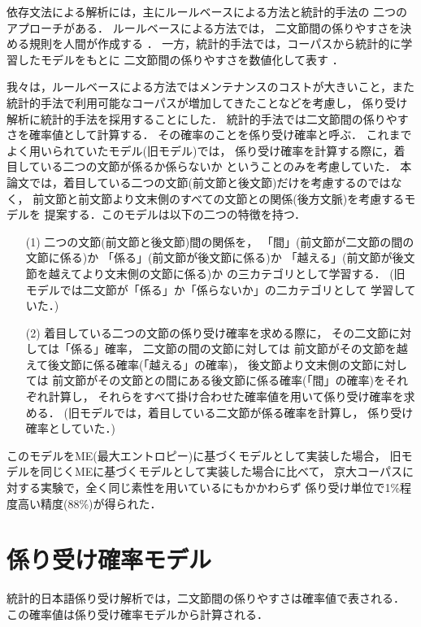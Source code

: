 依存文法による解析には，主にルールベースによる方法と統計的手法の
二つのアプローチがある．
ルールベースによる方法では，
二文節間の係りやすさを決める規則を人間が作成する
\cite{kurohashi:ipsj92,SShirai:95}．
一方，統計的手法では，コーパスから統計的に学習したモデルをもとに
二文節間の係りやすさを数値化して表す
\cite{collins:acl96,fujio:nl97,Haruno:ipsj98,ehara:nlp98,shirai:jnlp98:1}．

我々は，ルールベースによる方法ではメンテナンスのコストが大きいこと，また
統計的手法で利用可能なコーパスが増加してきたことなどを考慮し，
係り受け解析に統計的手法を採用することにした．
統計的手法では二文節間の係りやすさを確率値として計算する．
その確率のことを係り受け確率と呼ぶ．
これまでよく用いられていたモデル(旧モデル)では，
係り受け確率を計算する際に，着目している二つの文節が係るか係らないか
ということのみを考慮していた．
本論文では，着目している二つの文節(前文節と後文節)だけを考慮するのではなく，
前文節と前文節より文末側のすべての文節との関係(後方文脈)を考慮するモデルを
提案する．このモデルは以下の二つの特徴を持つ．
\begin{itemize}
\item[(1)] 二つの文節(前文節と後文節)間の関係を，
  「間」(前文節が二文節の間の文節に係る)か
  「係る」(前文節が後文節に係る)か
  「越える」(前文節が後文節を越えてより文末側の文節に係る)か
  の三カテゴリとして学習する．
  (旧モデルでは二文節が「係る」か「係らないか」の二カテゴリとして
  学習していた．)
\item[(2)] 着目している二つの文節の係り受け確率を求める際に，
  その二文節に対しては「係る」確率，
  二文節の間の文節に対しては
  前文節がその文節を越えて後文節に係る確率(「越える」の確率)，
  後文節より文末側の文節に対しては
  前文節がその文節との間にある後文節に係る確率(「間」の確率)をそれぞれ計算し，
  それらをすべて掛け合わせた確率値を用いて係り受け確率を求める．
  (旧モデルでは，着目している二文節が係る確率を計算し，
  係り受け確率としていた．)
\end{itemize}
このモデルをME(最大エントロピー)に基づくモデルとして実装した場合，
旧モデルを同じくMEに基づくモデルとして実装した場合に比べて，
京大コーパスに対する実験で，全く同じ素性を用いているにもかかわらず
係り受け単位で1\%程度高い精度(88\%)が得られた．

\section{係り受け確率モデル}
\label{sec:dependency_model}

統計的日本語係り受け解析では，二文節間の係りやすさは確率値で表される．
この確率値は係り受け確率モデルから計算される．

